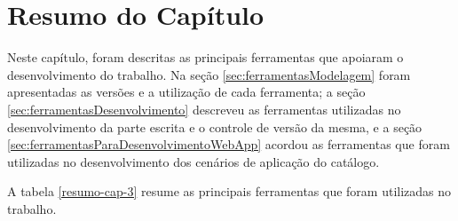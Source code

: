 \section{Resumo do Capítulo}

Neste capítulo, foram descritas as principais ferramentas que apoiaram o desenvolvimento do trabalho. Na seção \ref{sec:ferramentasModelagem} foram apresentadas as versões e a utilização de cada ferramenta; a seção \ref{sec:ferramentasDesenvolvimento} descreveu as ferramentas utilizadas no desenvolvimento da parte escrita e o controle de versão da mesma, e a seção \ref{sec:ferramentasParaDesenvolvimentoWebApp} acordou as ferramentas que foram utilizadas no desenvolvimento dos cenários de aplicação do catálogo. 


A tabela \ref{resumo-cap-3} resume as principais ferramentas que foram utilizadas no trabalho.

